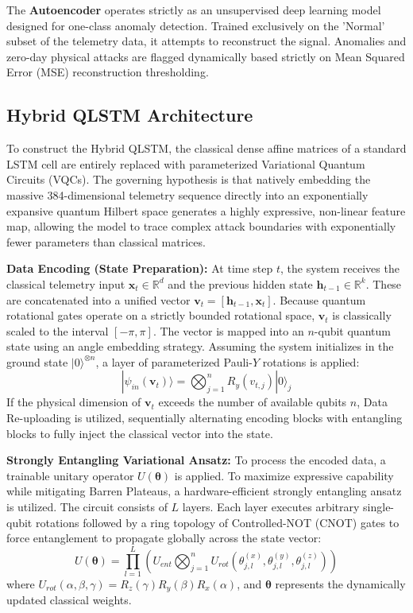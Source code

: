 \documentclass[10pt, journal, letterpaper, twocolumn]{IEEEtran}
\begin{document}
The \textbf{Autoencoder} operates strictly as an unsupervised deep learning model designed for one-class anomaly detection. Trained exclusively on the 'Normal' subset of the telemetry data, it attempts to reconstruct the signal. Anomalies and zero-day physical attacks are flagged dynamically based strictly on Mean Squared Error (MSE) reconstruction thresholding.

\subsection{Hybrid QLSTM Architecture}
To construct the Hybrid QLSTM, the classical dense affine matrices of a standard LSTM cell are entirely replaced with parameterized Variational Quantum Circuits (VQCs). The governing hypothesis is that natively embedding the massive 384-dimensional telemetry sequence directly into an exponentially expansive quantum Hilbert space generates a highly expressive, non-linear feature map, allowing the model to trace complex attack boundaries with exponentially fewer parameters than classical matrices.

\textbf{Data Encoding (State Preparation):}
At time step $t$, the system receives the classical telemetry input $\mathbf{x}_t \in \mathbb{R}^d$ and the previous hidden state $\mathbf{h}_{t-1} \in \mathbb{R}^k$. These are concatenated into a unified vector $\mathbf{v}_t = [\mathbf{h}_{t-1}, \mathbf{x}_t]$. Because quantum rotational gates operate on a strictly bounded rotational space, $\mathbf{v}_t$ is classically scaled to the interval $[-\pi, \pi]$. The vector is mapped into an $n$-qubit quantum state using an angle embedding strategy. Assuming the system initializes in the ground state $|0\rangle^{\otimes n}$, a layer of parameterized Pauli-$Y$ rotations is applied:
\begin{equation}
|\psi_{in}(\mathbf{v}_t)\rangle = \bigotimes_{j=1}^{n} R_y(v_{t, j}) |0\rangle_j
\end{equation}
If the physical dimension of $\mathbf{v}_t$ exceeds the number of available qubits $n$, Data Re-uploading \cite{data_reuploading} is utilized, sequentially alternating encoding blocks with entangling blocks to fully inject the classical vector into the state.

\textbf{Strongly Entangling Variational Ansatz:}
To process the encoded data, a trainable unitary operator $U(\boldsymbol{\theta})$ is applied. To maximize expressive capability while mitigating Barren Plateaus, a hardware-efficient strongly entangling ansatz is utilized. The circuit consists of $L$ layers. Each layer executes arbitrary single-qubit rotations followed by a ring topology of Controlled-NOT (CNOT) gates to force entanglement to propagate globally across the state vector:
\begin{equation}
U(\boldsymbol{\theta}) = \prod_{l=1}^{L} \left( U_{ent} \bigotimes_{j=1}^{n} U_{rot}(\theta_{j,l}^{(x)}, \theta_{j,l}^{(y)}, \theta_{j,l}^{(z)}) \right)
\end{equation}
where $U_{rot}(\alpha, \beta, \gamma) = R_z(\gamma) R_y(\beta) R_x(\alpha)$, and $\boldsymbol{\theta}$ represents the dynamically updated classical weights.
\end{document}

